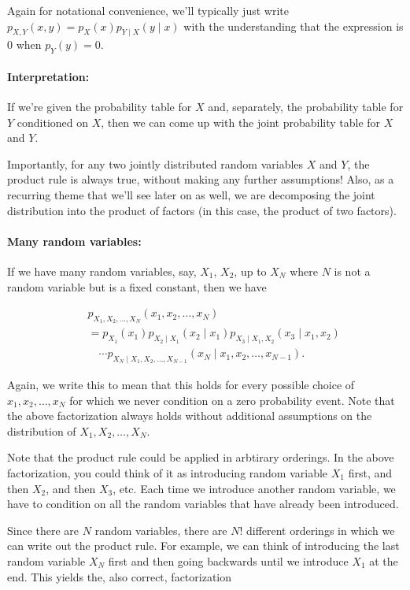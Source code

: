 \documentclass[6008notes.tex]{subfiles}
\begin{document}
Again for notational convenience, we'll typically just write $p_{X,Y}(x,y)=p_{X}(x)p_{Y\mid X}(y\mid x)$ with the understanding that the expression is 0 when $p_{Y}(y)=0$.

\paragraph{Interpretation:} If we're given the probability table for $X$ and, separately, the probability table for $Y$ conditioned on $X$, then we can come up with the joint probability table for $X$ and $Y$.

Importantly, for any two jointly distributed random variables $X$ and $Y$, the product rule is always true, without making any further assumptions! Also, as a recurring theme that we'll see later on as well, we are decomposing the joint distribution into the product of factors (in this case, the product of two factors).

\paragraph{Many random variables:} If we have many random variables, say, $X_1$, $X_2$, up to $X_N$ where $N$ is not a random variable but is a fixed constant, then we have

\begin{eqnarray*}
&&p_{X_1, X_2, \dots ,X_N}(x_1, x_2, \dots, x_N) \\
&&=
  p_{X_1}(x_1)
  p_{X_2 \mid X_1}(x_2 \mid x_1)
  p_{X_3 \mid X_1, X_2}(x_3 \mid x_1, x_2) \\
&&\quad
  \cdots
  p_{X_N \mid X_1, X_2, \dots, X_{N-1}}(x_N \mid x_1, x_2, \dots, x_{N-1}).
\end{eqnarray*}

Again, we write this to mean that this holds for every possible choice of $x_1, x_2, \dots , x_ N$ for which we never condition on a zero probability event. Note that the above factorization always holds without additional assumptions on the distribution of $X_1, X_2, \dots , X_ N$.

Note that the product rule could be applied in arbtirary orderings. In the above factorization, you could think of it as introducing random variable $X_1$ first, and then $X_2$, and then $X_3$, etc. Each time we introduce another random variable, we have to condition on all the random variables that have already been introduced.

Since there are $N$ random variables, there are $N!$ different orderings in which we can write out the product rule. For example, we can think of introducing the last random variable $X_ N$ first and then going backwards until we introduce $X_1$ at the end. This yields the, also correct, factorization
\end{document}
